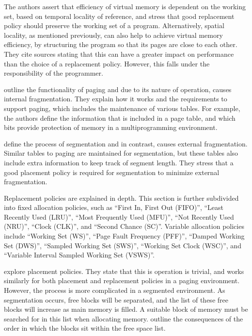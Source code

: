 The authors assert that efficiency of virtual memory is dependent on the working set, based on temporal locality of reference, and stress that good replacement policy should preserve the working set of a program. Alternatively, spatial locality, as mentioned previously, can also help to achieve virtual memory efficiency, by structuring the program so that its pages are close to each other. They cite sources stating that this can have a greater impact on performance than the choice of a replacement policy. However, this falls under the responsibility of the programmer.

\citet{VanWezenbeek1993} outline the functionality of paging and due to its nature of operation, causes internal fragmentation. They explain how it works and the requirements to support paging, which includes the maintenance of various tables. For example, the authors define the information that is included in a page table, and which bits provide protection of memory in a multiprogramming environment.

\citet{VanWezenbeek1993} define the process of segmentation and in contrast, causes external fragmentation. Similar tables to paging are maintained for segmentation, but these tables also include extra information to keep track of segment length. They stress that a good placement policy is required for segmentation to minimize external fragmentation.

Replacement policies are explained in depth. This section is further subdivided into fixed allocation policies, such as ``First In, First Out (FIFO)'', ``Least Recently Used (LRU)'', ``Most Frequently Used (MFU)'', ``Not Recently Used (NRU)'', ``Clock (CLK)'', and ``Second Chance (SC)''. Variable allocation policies include ``Working Set (WS)'', ``Page Fault Frequency (PFF)'', ``Damped Working Set (DWS)'', ``Sampled Working Set (SWS)'', ``Working Set Clock (WSC)'', and ``Variable Interval Sampled Working Set (VSWS)''.

\citet{VanWezenbeek1993} explore placement policies. They state that this is operation is trivial, and works similarly for both placement and replacement policies in a paging environment. However, the process is more complicated in a segmented environment. As segmentation occurs, free blocks will be separated, and the list of these free blocks will increase as main memory is filled. A suitable block of memory must be searched for in this list when allocating memory. \citet{VanWezenbeek1993} outline the consequences of the order in which the blocks sit within the free space list.